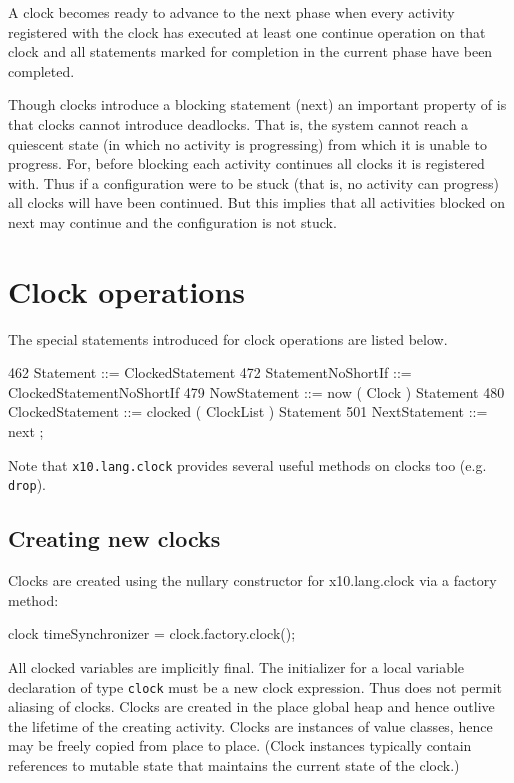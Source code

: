 A clock becomes ready to advance to the next phase when every activity
registered with the clock has executed at least one {\cf continue}
operation on that clock and all statements marked for completion in
the current phase have been completed.

Though clocks introduce a blocking statement ({\cf next}) an important
property of \Xten{} is that clocks cannot introduce deadlocks. That is,
the system cannot reach a quiescent state (in which no activity is
progressing) from which it is unable to progress. For, before blocking
each activity continues all clocks it is registered with. Thus if a
configuration were to be stuck (that is, no activity can progress) all
clocks will have been continued. But this implies that all activities
blocked on {\cf next} may continue and the configuration is not stuck.

\section{Clock operations}
The special statements introduced for clock operations are listed below.
\begin{x10}
462 Statement ::= ClockedStatement
472 StatementNoShortIf ::= ClockedStatementNoShortIf
479   NowStatement ::= now ( Clock ) Statement
480   ClockedStatement ::= clocked ( ClockList ) Statement
501   NextStatement ::= next ;
\end{x10}

Note that {\tt x10.lang.clock} provides several useful methods on
clocks too (e.g. {\tt drop}).

\subsection{Creating new clocks}
Clocks are created using the nullary constructor for {\cf
x10.lang.clock} via a factory method:

\begin{x10}
clock timeSynchronizer = clock.factory.clock();
\end{x10}

All clocked variables are implicitly final. The initializer for a
local variable declaration of type {\tt clock} must be a new clock
expression. Thus \Xten{} does not permit aliasing of clocks.
Clocks are created in the place global heap and hence outlive the
lifetime of the creating activity.  Clocks are instances of value
classes, hence may be freely copied from place to
place. (Clock instances typically contain references to mutable state
that maintains the current state of the clock.)

